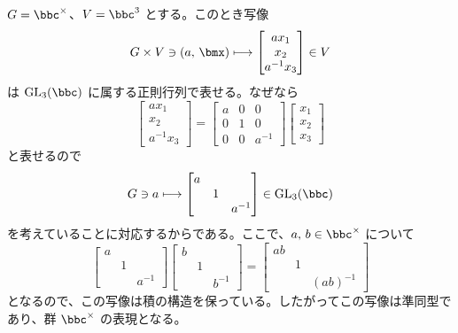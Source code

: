 \documentclass[a4paper]{ltjsarticle}
\begin{document}
\begin{exm}
  $G = \bbc^\times$、$V = \bbc^3$ とする。このとき写像
  \begin{equation}
    G\times V\ni(a,\,\bmx)\longmapsto\begin{bmatrix}
      ax_1\\
      x_2\\
      a^{-1}x_3
    \end{bmatrix}\in V
  \end{equation}
  は $\GL_3(\bbc)$ に属する正則行列で表せる。なぜなら
  \begin{equation}
    \begin{bmatrix}
      ax_1\\
      x_2\\
      a^{-1}x_3
    \end{bmatrix} = \begin{bmatrix}
      a & 0 & 0\\
      0 & 1 & 0\\
      0 & 0 & a^{-1}
    \end{bmatrix}\begin{bmatrix}
      x_1\\
      x_2\\
      x_3
    \end{bmatrix}
  \end{equation}
  と表せるので
  \begin{equation}
    G\ni a\longmapsto\begin{bmatrix}
      a&&\\
      &1&\\
      &&a^{-1}
    \end{bmatrix}\in\GL_3(\bbc)
  \end{equation}
  を考えていることに対応するからである。ここで、$a,\,b\in\bbc^\times$ について
  \begin{equation}
    \begin{bmatrix}
      a&&\\
      &1&\\
      &&a^{-1}
    \end{bmatrix}\begin{bmatrix}
      b&&\\
      &1&\\
      &&b^{-1}
    \end{bmatrix} = \begin{bmatrix}
      ab&&\\
      &1&\\
      &&(ab)^{-1}
    \end{bmatrix}
  \end{equation}
  となるので、この写像は積の構造を保っている。したがってこの写像は準同型であり、群 $\bbc^\times$ の表現となる。
\end{exm}
\end{document}
